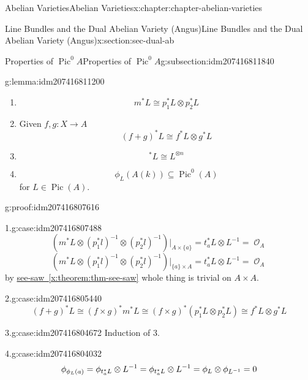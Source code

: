 \documentclass[oneside,10pt,]{book}
\newcommand{\qedhere}{\relax}
\numberwithin{equation}{section}
\newcommand{\sheaf}[1]{\operatorname{\mathcal{#1}}}
\DeclareMathOperator{\Pic}{Pic}
\begin{document}
\begin{chapterptx}{Abelian Varieties}{}{Abelian Varieties}{}{}{x:chapter:chapter-abelian-varieties}
\begin{sectionptx}{Line Bundles and the Dual Abelian Variety (Angus)}{}{Line Bundles and the Dual Abelian Variety (Angus)}{}{}{x:section:sec-dual-ab}
\begin{subsectionptx}{Properties of \(\Pic^0 A\)}{}{Properties of \(\Pic^0 A\)}{}{}{g:subsection:idm207416811840}
\begin{lemma}{}{}{g:lemma:idm207416811200}
\begin{enumerate}
\item{}%
\begin{equation*}
m^* L \cong p_1^* L\otimes p_2^* L
\end{equation*}
%
\item{}Given \(f,g \colon X \to A\)%
\begin{equation*}
(f+g)^* L \cong f^* L \otimes g^* L
\end{equation*}
%
\item{}%
\begin{equation*}
[n]^* L \cong L^{\otimes n}
\end{equation*}
%
\item{}%
\begin{equation*}
\phi_L(A(k)) \subseteq \Pic^0(A)
\end{equation*}
for \(L \in \Pic (A)\).%
\end{enumerate}
%
\end{lemma}
\begin{proofptx}{}{g:proof:idm207416807616}
\begin{case}{}{1.}{g:case:idm207416807488}
%
\begin{equation*}
(m^*L\otimes (p_1^*l)^{-1} \otimes (p_2^*l)^{-1})|_{A\times\{a\}} = t_a^*L \otimes L^{-1} = \sheaf O_A
\end{equation*}
%
\begin{equation*}
(m^*L\otimes (p_1^*l)^{-1} \otimes (p_2^*l)^{-1})|_{\{a\}\times A} = t_a^*L \otimes L^{-1} = \sheaf O_A
\end{equation*}
by \hyperref[x:theorem:thm-see-saw]{see-saw~\ref{x:theorem:thm-see-saw}} whole thing is trivial on \(A\times A\).%
\end{case}
\begin{case}{}{2.}{g:case:idm207416805440}
%
\begin{equation*}
(f+g)^*L\cong (f\times g)^* m^*L \cong (f\times g)^*(p_1^*L \otimes p_2^*L) \cong f^*L \otimes g^*L
\end{equation*}
%
\end{case}
\begin{case}{}{3.}{g:case:idm207416804672}
Induction of 3.%
\end{case}
\begin{case}{}{4.}{g:case:idm207416804032}
%
\begin{equation*}
\phi_{\phi_L(a)} = \phi_{t^*_a L}\otimes L^{-1} = \phi _{t_a^*L}\otimes L^{-1} = \phi_L \otimes \phi_{L^{-1}} = 0\qedhere
\end{equation*}
%
\end{case}

\end{proofptx}
\end{subsectionptx}
\end{sectionptx}
\end{chapterptx}
\end{document}
